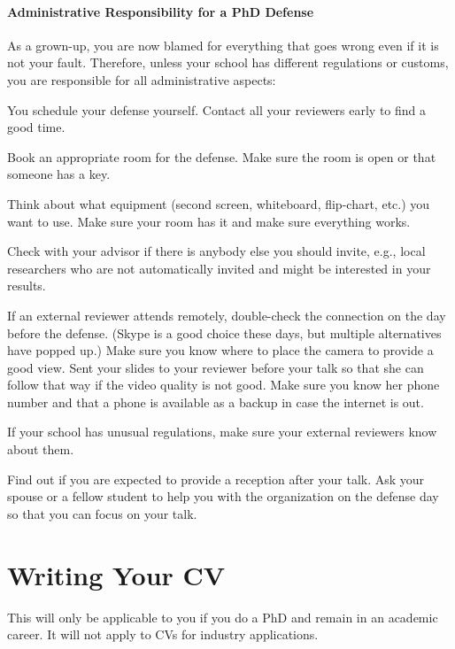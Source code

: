 \documentclass[12pt]{article}
\begin{document}
\paragraph{Administrative Responsibility for a PhD Defense}
As a grown-up, you are now blamed for everything that goes wrong even if it is not your fault.
Therefore, unless your school has different regulations or customs, you are responsible for all administrative aspects:
\begin{compactitem}
 \item You schedule your defense yourself. Contact all your reviewers early to find a good time.
 \item Book an appropriate room for the defense. Make sure the room is open or that someone has a key.
 \item Think about what equipment (second screen, whiteboard, flip-chart, etc.) you want to use.
   Make sure your room has it and make sure everything works.
 \item Check with your advisor if there is anybody else you should invite, e.g., local researchers who are not automatically invited and might be interested in your results.
 \item If an external reviewer attends remotely, double-check the connection on the day before the defense. (Skype is a good choice these days, but multiple alternatives have popped up.)
   Make sure you know where to place the camera to provide a good view.
   Sent your slides to your reviewer before your talk so that she can follow that way if the video quality is not good.
   Make sure you know her phone number and that a phone is available as a backup in case the internet is out.
 \item If your school has unusual regulations, make sure your external reviewers know about them.
 \item Find out if you are expected to provide a reception after your talk. Ask your spouse or a fellow student to help you with the organization on the defense day so that you can focus on your talk.
\end{compactitem}

\section{Writing Your CV}

This will only be applicable to you if you do a PhD and remain in an academic career.
It will not apply to CVs for industry applications.
\end{document}
